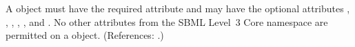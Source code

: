 A \LocalParameter object must have the required attribute  and
may have the optional attributes , , , ,
,  and .  No other attributes from
the SBML Level~3 Core namespace are permitted on a \LocalParameter object.
(References: .)
